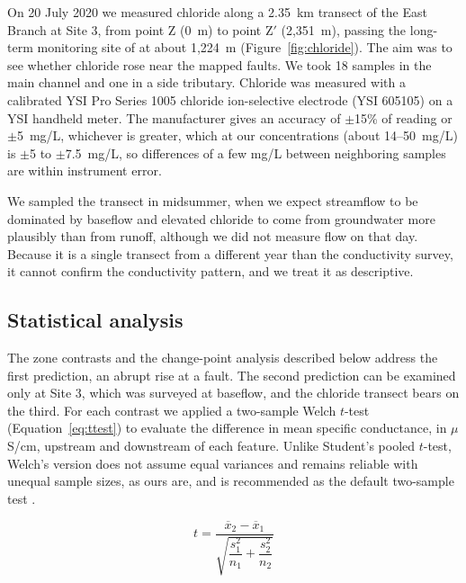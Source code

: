 \documentclass{article}
\begin{document}
On 20 July 2020 we measured chloride along a 2.35~km transect of the East Branch at Site 3, from point Z (0~m) to point Z$'$ (2{,}351~m), passing the long-term monitoring site of \citet{kelly2019} at about 1{,}224~m (Figure~\ref{fig:chloride}). The aim was to see whether chloride rose near the mapped faults. We took 18 samples in the main channel and one in a side tributary. Chloride was measured with a calibrated YSI Pro Series 1005 chloride ion-selective electrode (YSI 605105) on a YSI handheld meter. The manufacturer gives an accuracy of $\pm$15\% of reading or $\pm$5~mg/L, whichever is greater, which at our concentrations (about 14--50~mg/L) is $\pm$5 to $\pm$7.5~mg/L, so differences of a few mg/L between neighboring samples are within instrument error.

We sampled the transect in midsummer, when we expect streamflow to be dominated by baseflow and elevated chloride to come from groundwater more plausibly than from runoff, although we did not measure flow on that day. Because it is a single transect from a different year than the conductivity survey, it cannot confirm the conductivity pattern, and we treat it as descriptive.

\subsection{Statistical analysis}
\label{sec:stats}

The zone contrasts and the change-point analysis described below address the first prediction, an abrupt rise at a fault. The second prediction can be examined only at Site 3, which was surveyed at baseflow, and the chloride transect bears on the third. For each contrast we applied a two-sample Welch $t$-test (Equation~\ref{eq:ttest}) to evaluate the difference in mean specific conductance, in $\mu$S/cm, upstream and downstream of each feature. Unlike Student's pooled $t$-test, Welch's version does not assume equal variances and remains reliable with unequal sample sizes, as ours are, and is recommended as the default two-sample test \citep{ruxton2006}.

\begin{equation}
	t = \frac{\overline{x}_{2} - \overline{x}_{1}}
	         {\sqrt{\dfrac{s_{1}^{2}}{n_{1}} + \dfrac{s_{2}^{2}}{n_{2}}}}
	\label{eq:ttest}
\end{equation}
\end{document}
